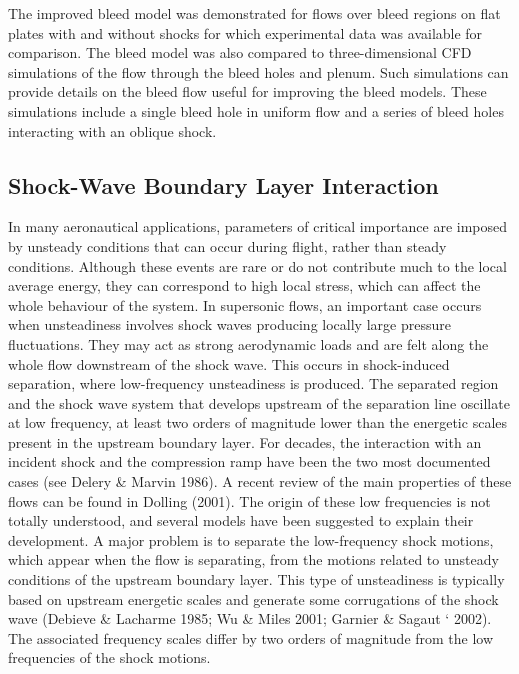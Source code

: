 The improved bleed model was demonstrated for flows over bleed regions on flat plates with and without shocks for which experimental data was available for comparison. The bleed model was also compared to three-dimensional CFD simulations of the flow through the bleed holes and plenum. Such simulations can provide details on the bleed flow useful for improving the bleed models. These simulations include a single bleed hole in uniform flow and a series of bleed holes interacting with an oblique shock. \cite{Slater2012}

\subsection{Shock-Wave Boundary Layer Interaction}



\cite{Piponniau2009}

In many aeronautical applications, parameters of critical importance are imposed by unsteady conditions that can occur during flight, rather than steady conditions. Although these events are rare or do not contribute much to the local average energy, they can correspond to high local stress, which can affect the whole behaviour of the system. In supersonic flows, an important case occurs when unsteadiness involves shock waves producing locally large pressure fluctuations. They may act as strong aerodynamic loads and are felt along the whole flow downstream of the shock wave. This occurs in shock-induced separation, where low-frequency unsteadiness is produced. The separated region and the shock wave system that develops upstream of the separation line oscillate at low frequency, at least two orders of magnitude lower than the energetic scales present in the upstream boundary layer. For decades, the interaction with an incident shock and the compression ramp have been the two most documented cases (see Delery \& Marvin 1986). A recent review of the main properties of these flows can be found in Dolling (2001). The origin of these low frequencies is not totally understood, and several models have been suggested to explain their development. A major problem is to separate the low-frequency shock motions, which appear when the flow is separating, from the motions related to unsteady conditions of the upstream boundary layer. This type of unsteadiness is typically based on upstream energetic scales and generate some corrugations of the shock wave (Debieve \& Lacharme 1985; Wu \& Miles 2001; Garnier \& Sagaut ` 2002). The associated frequency scales differ by two orders of magnitude from the low frequencies of the shock motions.

